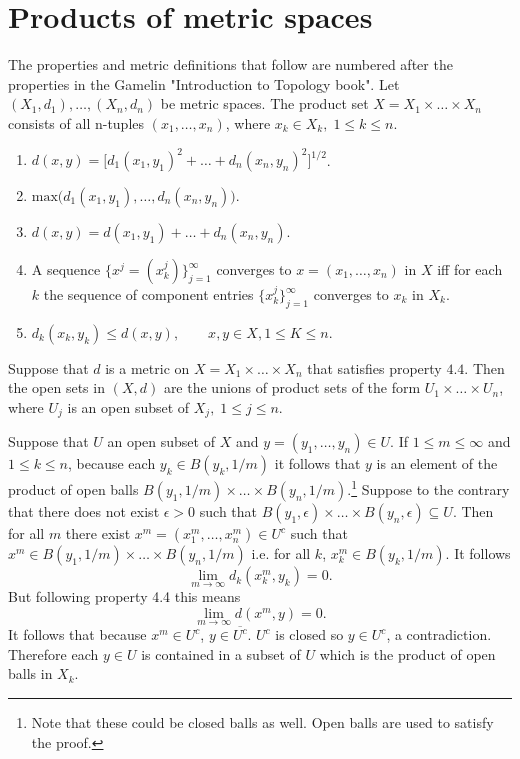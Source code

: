 \documentclass[nobib,notoc]{tufte-handout}
\begin{document}
\section{Products of metric spaces}
	The properties and metric definitions that follow are numbered after the properties in the Gamelin "Introduction to Topology book". Let \((X_1,d_1),\ldots,(X_n,d_n)\) be metric spaces. The product set \(X=X_1\times\ldots\times X_n\) consists of all n-tuples \((x_1,\ldots,x_n)\), where \(x_k\in X_k,\; 1\leq k\leq n\).
\begin{enumerate}[label=(4.\arabic*)]
	\item \(d(x,y)=\big[d_1(x_1,y_1)^2+\ldots+d_n(x_n,y_n)^2\big]^{1/2}\).
	\item \(\text{max}\big(d_1(x_1,y_1),\ldots,d_n(x_n,y_n)\big)\).
	\item \(d(x,y)=d(x_1,y_1)+\ldots+d_n(x_n,y_n)\).
	\item A sequence \(\{x^{j}=(x_k^j)\}_{j=1}^{\infty}\) converges to \(x=(x_1,\ldots,x_n)\) in \(X\) iff for each \(k\) the sequence of component entries \(\{x_k^j\}_{j=1}^{\infty}\) converges to \(x_k\) in \(X_k\).
	\item \(d_k(x_k,y_k)\leq d(x,y),\qquad x,y\in X, 1\leq K\leq n\).
\end{enumerate}
\begin{thm}
	Suppose that \(d\) is a metric on \(X=X_1\times\ldots\times X_n\) that satisfies property \(4.4\). Then the open sets in \((X,d)\) are the unions of product sets of the form \(U_1\times\ldots\times U_n\), where \(U_j\) is an open subset of \(X_j,\;1\leq j\leq n\).
	\begin{IEEEproof}
		Suppose that \(U\) an open subset of \(X\) and \(y=(y_1,\ldots, y_n)\in U\). If \(1\leq m\leq\infty\) and \(1\leq k\leq n\), because each \(y_k\in B(y_k,1/m)\) it follows that \(y\) is an element of the product of open balls \(B(y_1,1/m)\times\ldots\times B(y_n,1/m)\).\footnote{Note that these could be closed balls as well. Open balls are used to satisfy the proof.} Suppose to the contrary that there does not exist \(\epsilon>0\) such that \(B(y_1,\epsilon)\times\ldots\times B(y_n,\epsilon)\subseteq U\). Then for all \(m\) there exist \(x^m=(x^{m}_{1},\ldots,x^{m}_{n})\in U^{c}\) such that \(x^m\in B(y_1,1/m)\times\ldots\times B(y_n,1/m)\) i.e. for all \(k\), \(x^{m}_{k}\in B(y_k,1/m)\). It follows
		\begin{equation*}
			\lim_{m\rightarrow\infty}d_{k}(x^{m}_{k}, y_k)=0.
		\end{equation*}
		But following property 4.4 this means
		\begin{equation*}
			\lim_{m\rightarrow\infty}d(x^{m},y)=0.
		\end{equation*}
		It follows that because \(x^{m}\in U^{c}\), \(y\in \overline{U^{c}}\). \(U^{c}\) is closed so \(y\in U^{c}\), a contradiction. Therefore each \(y\in U\) is contained in a subset of \(U\) which is the product of open balls in \(X_k\).
	\end{IEEEproof}
\end{thm}
\end{document}
